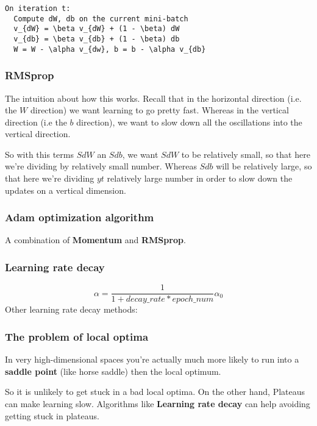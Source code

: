 \begin{lstlisting}
On iteration t:
  Compute dW, db on the current mini-batch
  v_{dW} = \beta v_{dW} + (1 - \beta) dW
  v_{db} = \beta v_{db} + (1 - \beta) db
  W = W - \alpha v_{dw}, b = b - \alpha v_{db}
\end{lstlisting}

\subsubsection*{RMSprop}
The intuition about how this works. Recall that in the horizontal direction (i.e. the $W$ direction) we want learning to go pretty fast. Whereas in the vertical direction (i.e the $b$ direction), we want to slow down all the oscillations into the vertical direction.

So with this terms $SdW$ an $Sdb$, we want $SdW$ to be relatively small, so that here we're dividing by relatively small number. Whereas $Sdb$ will be relatively large, so that here we're dividing $yt$ relatively large number in order to slow down the updates on a vertical dimension.

\subsubsection*{Adam optimization algorithm}
A combination of \textbf{Momentum} and \textbf{RMSprop}.

\subsubsection*{Learning rate decay}
\begin{equation}
    \alpha = \frac{1}{1 + decay\_rate * epoch\_num} \alpha_0
\end{equation}
Other learning rate decay methods:

\subsubsection*{The problem of local optima}
In very high-dimensional spaces you're actually much more likely to run into a \textbf{saddle point} (like horse saddle) then the local optimum.

So it is unlikely to get stuck in a bad local optima. On the other hand, Plateaus can make learning slow. Algorithms like \textbf{Learning rate decay} can help avoiding getting stuck in plateaus.

